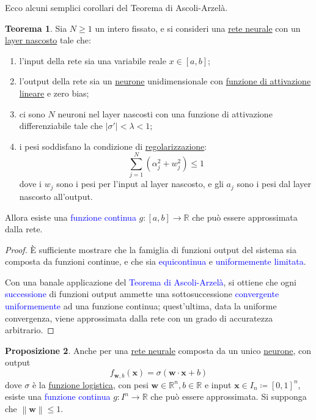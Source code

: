 \documentclass[10pt]{book}
\newcommand{\1}{\mathds{1}}
\newcommand{\R}{\mathds{R}}
\newcommand{\norma}[1]{%
\left\lVert#1\right\rVert%
}
\theoremstyle{definition}%
\newtheorem{thm}{Teorema}[section]
\newtheorem{prop}[thm]{Proposizione}
\theoremstyle{plain}
\theoremstyle{remark}
\renewcommand{\href}[2]{\textcolor{blue}{#2}}
\begin{document}
Ecco alcuni semplici corollari del Teorema di Ascoli-Arzelà.

\begin{thm}
Sia \(N\ge {1}\) un intero fissato, e si consideri una \hyperref[sec:orge70a756]{rete neurale} con un \hyperref[sec:orgf296121]{layer nascosto} tale che:
\begin{enumerate}
\item l'input della rete sia una variabile reale \(x \in [a,b]\);
\item l'output della rete sia un \hyperref[sec:org652f4d6]{neurone} unidimensionale con \hyperref[sec:org21c5504]{funzione di attivazione lineare} e zero bias;
\item ci sono \(N\) neuroni nel layer nascosti con una funzione di attivazione differenziabile tale che \(|\sigma'|<\lambda<1\);
\item i pesi soddisfano la condizione di \hyperref[sec:org2a2f4d5]{regolarizzazione}:
\begin{equation*}
 \sum_{j=1}^{N} (\alpha_{j}^{2} + w_{j}^{2})\le 1
\end{equation*}
dove i \(w_{j}\) sono i pesi per l'input al layer nascosto, e gli \(a_{j}\) sono i pesi dal layer nascosto all'output.
\end{enumerate}

Allora esiste una \href{../../../../../org/roam/20250103103252-funzione_continua.org}{funzione continua} \(g:[a,b]\to \R\) che può essere approssimata dalla rete.
\end{thm}

\begin{proof}
È sufficiente mostrare che la famiglia di funzioni output del sistema sia composta da funzioni continue, e che sia \href{../../../../../org/roam/20250629113211-famiglia_di_funzioni_equicontinua.org}{equicontinua} e \href{../../../../../org/roam/20250629110306-funzioni_uniformemente_limitate.org}{uniformemente limitata}.

Con una banale applicazione del \href{../../../../../org/roam/20250629120441-teorema_di_ascoli_arzela.org}{Teorema di Ascoli-Arzelà}, si ottiene che ogni \href{../../../../../org/roam/20250629105815-successione_di_funzioni.org}{successione} di funzioni output ammette una sottosuccessione \href{../../../../../org/roam/20250629105745-convergenza_uniforme.org}{convergente uniformemente} ad una funzione continua; quest'ultima, data la uniforme convergenza, viene approssimata dalla rete con un grado di accuratezza arbitrario.
\end{proof}
\begin{prop}
Anche per una \hyperref[sec:orge70a756]{rete neurale} composta da un unico \hyperref[sec:org652f4d6]{neurone}, con output
\begin{equation*}
f_{\bm{w},b}(\bm{x}) = \sigma(\bm{w}\cdot\bm{x} + b)
\end{equation*}
dove \(\sigma\) è la \hyperref[sec:orgb858b24]{funzione logistica}, con pesi \(\bm{w} \in \R^{n}, b \in \R\) e input \(\bm{x} \in I_{n} \coloneqq [0,1]^{n}\), esiste una \href{../../../../../org/roam/20250103103252-funzione_continua.org}{funzione continua} \(g:I^{n}\to \R\) che può essere approssimata. Si supponga che \(\norma{\bm{w}}\le 1\).
\end{prop}
\end{document}

